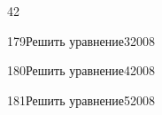 \begin{TrigSourcePage}{42}
\begin{TrigExercise}{179}{Решить уравнение}{3}{2008}
\end{TrigExercise}
\begin{TrigExercise}{180}{Решить уравнение}{4}{2008}
\end{TrigExercise}
\begin{TrigExercise}{181}{Решить уравнение}{5}{2008}
\end{TrigExercise}
\end{TrigSourcePage}

